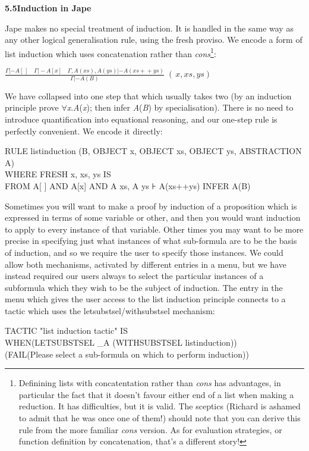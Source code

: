 \documentclass[11pt]{book}
\newcommand{\tab}{\hspace{5mm}}
\begin{document}
\textbf{5.5\tab Induction in Jape}


Jape makes no special treatment of induction. It is handled in the same way as any other logical generalisation rule, using the fresh proviso. We encode a form of list induction which uses concatenation rather than \textit{cons}\footnote{Definining lists with concatentation rather than \textit{cons} has advantages, in particular the fact that it doesn't favour either end of a list when making a reduction. It has difficulties, but it is valid. The sceptics (Richard is ashamed to admit that he was once one of them!) should note that you can derive this rule from the more familiar \textit{cons} version. As for evaluation strategies, or function definition by concatenation, that's a different story!}:


$\frac{\Gamma  |- A[\,]\quad \Gamma  |- A[x]\quad \Gamma,A\left( xs\right),A\left( ys\right)  |- A\left( xs{}+{}+{}ys\right) }{\Gamma  |- A\left( B\right) } \;(\,x,xs,ys)$

We have collapsed into one step that which usually takes two (by an induction principle prove \ensuremath{\forall}\textit{x}.\textit{A}(\textit{x}); then infer \textit{A}(\textit{B}) by specialisation). There is no need to introduce quantification into equational reasoning, and our one-step rule is perfectly convenient. We encode it directly:

RULE listinduction (B, OBJECT x, OBJECT xs, OBJECT ys, ABSTRACTION A) \\
\tab WHERE FRESH x, xs, ys IS\\
\tab \tab FROM A[ ] AND A[x] AND A xs, A ys ⊦ A(xs++ys) INFER A(B)


Sometimes you will want to make a proof by induction of a proposition which is expressed in terms of some variable or other, and then you would want induction to apply to every instance of that variable. Other times you may want to be more precise in specifying just what instances of what sub-formula are to be the basis of induction, and so we require the user to specify those instances. We could allow both mechanisms, activated by different entries in a menu, but we have instead required our users always to select the particular instances of a subformula which they wish to be the subject of induction. The entry in the menu which gives the user access to the list induction principle connects to a tactic which uses the letsubstsel/withsubstsel mechanism:

TACTIC "list induction tactic" IS \\
\tab WHEN\tab (LETSUBSTSEL \_A (WITHSUBSTSEL listinduction))\\
\tab \tab (FAIL(Please select a sub-formula on which to perform induction))
\end{document}
